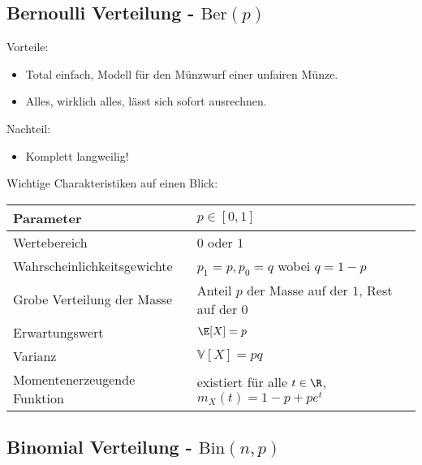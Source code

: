 \subsection{Bernoulli Verteilung - $\text{Ber}(p)$}

{Vorteile:} 
\begin{itemize}
	\item Total einfach, Modell f\"ur den M\"unzwurf einer unfairen M\"unze.
	\item Alles, wirklich alles, l\"asst sich sofort ausrechnen.
\end{itemize}

{Nachteil:}
\begin{itemize}
	\item Komplett langweilig!
\end{itemize}

Wichtige Charakteristiken auf einen Blick:
\begin{center}
\begin{tabular}[h]{|l|l|}
\hline
Parameter& $p\in [0,1]$ \\
\hline
Wertebereich & $0$ oder $1$\\
\hline
Wahrscheinlichkeitsgewichte& $p_1=p, p_0=q$ wobei $q=1-p$\\
\hline
Grobe Verteilung der Masse & Anteil $p$ der Masse auf der $1$, Rest auf der $0$\\
\hline
Erwartungswert& $\E[X]=p$ \\
\hline
Varianz & $\mathbb V[X]=pq$\\
\hline
Momentenerzeugende Funktion& existiert f\"ur alle $t\in \R$, $m_X(t)=1-p+pe^t$\\
\hline
\end{tabular}
\end{center}





\subsection{Binomial Verteilung - $\text{Bin}(n,p)$}

